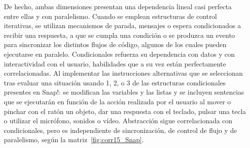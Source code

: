 \documentclass[a4paper, 12pt]{book}
\begin{document}
De hecho, ambas dimensiones presentan una dependencia lineal casi perfecta entre ellas y con paralelismo. Cuando se emplean estructuras de control iterativas, se utilizan mecanismos de parada, mensajes o espera condicionados a recibir una respuesta, a que se cumpla una condición o se produzca un evento para sincronizar los distintos flujos de código, algunos de los cuales pueden ejecutarse en paralelo.
Condicionales refuerza su dependencia con datos y con interactividad con el usuario, habilidades que a su vez están perfectamente correlacionadas. Al implementar las instrucciones alternativas que se seleccionan tras evaluar una situación usando 1, 2, o 3 de las estructuras condicionales presentes en Snap!: se modifican las variables y las listas y se incluyen sentencias que se ejecutarán en función de la acción realizada por el usuario al mover o pinchar con el ratón un objeto, dar una respuesta con el teclado, pulsar una tecla o utilizar el micrófono, sonidos o vídeo. Abstracción sigue correlacionada con condicionales, pero es independiente de sincronización, de control de flujo y de paralelismo, según la matriz~\ref{fig:corr15_Snap}.
\end{document}
